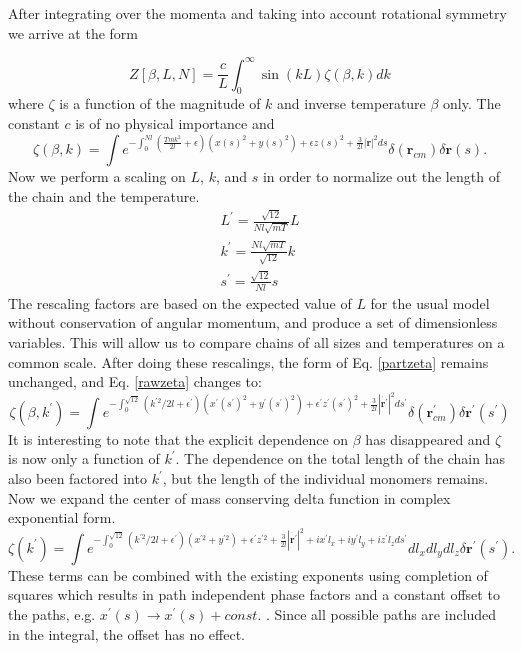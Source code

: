 \documentclass[11pt]{ucthesis}
\begin{document}
After integrating over the momenta and taking into account rotational symmetry we arrive at the form~\cite{DeutschExactVac}

\begin{equation}\label{partzeta}
Z[\beta,L,N] = \frac{c}{L} \int_0^\infty \sin(kL)\zeta(\beta,k)dk
\end{equation}
where $\zeta$ is a function of the magnitude of $k$ and inverse temperature  $\beta$ only. The constant $c$ is of no physical importance and
\begin{equation}\label{rawzeta}
\zeta(\beta,k)= \int e^{ -\int^{Nl}_0 (\frac{Tmk^2}{2l} +\epsilon)(x(s)^2 + y(s)^2)+\epsilon z(s)^2 + \frac{3}{2l}  |\dot{\mathbf{r}}|^2  ds}\delta(\mathbf{r}_{cm}) \delta \mathbf{r}(s) .
\end{equation}
Now we perform a scaling on $L$, $k$, and $s$ in order to normalize out the length of the chain and the temperature.
\begin{eqnarray}
L^\prime = \frac{\sqrt{12}}{Nl\sqrt{mT}} L\\
k^\prime = \frac{Nl\sqrt{mT}}{\sqrt{12}} k\\
s^\prime = \frac{\sqrt{12}}{Nl} s
\end{eqnarray}
The rescaling factors are based on the expected value of $L$ for the usual model without conservation of angular momentum, and produce a set of dimensionless variables. This will allow us to compare chains of all sizes and temperatures on a common scale.
After doing these rescalings, the form of Eq. \ref{partzeta} remains unchanged, and Eq. \ref{rawzeta} changes to:
\begin{equation}\label{scaledzeta}
\zeta(\beta,k^\prime)= \int e^{-\int_0^{\sqrt{12}} (k^{\prime2}/2l + \epsilon^\prime)(x^\prime(s^\prime)^2 + y^\prime(s^\prime)^2 ) + \epsilon^\prime z^\prime(s^\prime)^2  + \frac{3}{2l} |\dot{\mathbf{r}^\prime}|^2 ds^\prime}\delta(\mathbf{r}^\prime_{cm}) \delta \mathbf{r^\prime}(s^\prime)
\end{equation}
It is interesting to note that the explicit dependence on $\beta$ has disappeared and $\zeta$ is now only a function of $k^\prime$. The dependence on the total length of the chain has also been factored into $k^\prime$, but the length of the individual monomers remains.
Now we expand the center of mass conserving delta function in complex exponential form.
\begin{equation}
\zeta(k^\prime)= \int e^{-\int_0^{\sqrt{12}} (k^{\prime2}/2l + \epsilon^\prime)(x^{\prime2} + y^{\prime2} ) + \epsilon^\prime z^{\prime2}  + \frac{3}{2l} |\dot{\mathbf{r}^\prime}|^2 + i x^\prime l_x + i y^\prime l_y + i z^\prime l_z ds^\prime}  dl_xdl_ydl_z \delta \mathbf{r^\prime}(s^\prime) .
\end{equation}
These terms can be combined with the existing exponents using completion of squares which results in path independent phase factors and a constant offset to the paths, e.g. $x^\prime (s) \to x^\prime (s) + const.$ . Since all possible paths are included in the integral, the offset has no effect.
\end{document}

